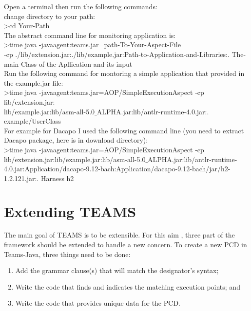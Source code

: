 \documentclass{report}
\begin{document}
Open a terminal then run the following commands:\\
change directory to your path:\\
	\textgreater cd Your-Path  \\
The abstract command line for monitoring application is:\\
\textgreater time java -javaagent:teams.jar=path-To-Your-Aspect-File\\
	 -cp ./lib/extension.jar:./lib/example.jar:Path-to-Application-and-Libraries:. The-main-Class-of-the-Apllication-and-its-input\\	
Run the following command for montoring a simple application that provided in the example.jar file:\\
\textgreater time java -javaagent:teams.jar=AOP/SimpleExecutionAspect -cp lib/extension.jar:\\lib/example.jar:lib/asm-all-5.0\underline{ }ALPHA.jar:lib/antlr-runtime-4.0.jar:. example/UserClass \\

For example for Dacapo I used the following command line (you need to extract Dacapo package, here is in download directory):\\
	\textgreater time java -javaagent:teams.jar=AOP/SimpleExecutionAspect -cp lib/extension.jar:lib/example.jar:lib/asm-all-5.0\underline{ }ALPHA.jar:lib/antlr-runtime-4.0.jar:Application/dacapo-9.12-bach:Application/dacapo-9.12-bach/jar/h2-1.2.121.jar:. Harness h2
	

\section{Extending T{\small EAMS}}
The main goal of T{\small EAMS} is to be extensible. For this aim , three part of the framework should be extended to handle a new concern. To create a new PCD in Teams-Java, three things need to be done:
\begin{enumerate}
\item Add the grammar clause(s) that will match the designator's syntax;
\item Write the code that finds and indicates the matching execution points; and
\item Write the code that provides unique data for the PCD.
\end{enumerate}
\end{document}
